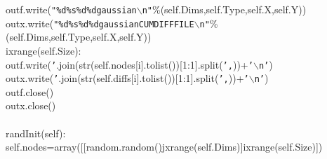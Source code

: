 {{\begin{tabbing}
\hspace{48pt}outf.write({\texttt{\string"\%d\hspace{6pt}\%s\hspace{6pt}\%d\hspace{6pt}\%d\hspace{6pt}gaussian$\backslash$n\string"}}\%(self.Dims,self.Type,self.X,self.Y))\\
\hspace{48pt}outx.write({\texttt{\string"\%d\hspace{6pt}\%s\hspace{6pt}\%d\hspace{6pt}\%d\hspace{6pt}gaussian\hspace{6pt}CUM\hspace{6pt}DIFF\hspace{6pt}FILE$\backslash$n\string"}}\%(self.Dims,self.Type,self.X,self.Y))\\
\hspace{6pt}i\hspace{6pt}xrange(self.Size):\\
\hspace{72pt}outf.write({\texttt{{'}\hspace{6pt}{'}}}.join(str(self.nodes{[}i{]}.tolist()){[}1:\dash{}1{]}.split({\texttt{{'},\hspace{6pt}{'}}}))+{\texttt{{'}$\backslash$n{'}}})\\
\hspace{72pt}outx.write({\texttt{{'}\hspace{6pt}{'}}}.join(str(self.diffs{[}i{]}.tolist()){[}1:\dash{}1{]}.split({\texttt{{'},\hspace{6pt}{'}}}))+{\texttt{{'}$\backslash$n{'}}})\\
\hspace{48pt}outf.close()\\
\hspace{48pt}outx.close()\\
\\
\hspace{6pt}randInit(self):\\
\hspace{48pt}self.nodes\hspace{6pt}=\hspace{6pt}array({[}{[}random.random()\hspace{6pt}j\hspace{6pt}xrange(self.Dims){]}\hspace{6pt}i\hspace{6pt}xrange(self.Size){]})\\

\end{tabbing}}}

